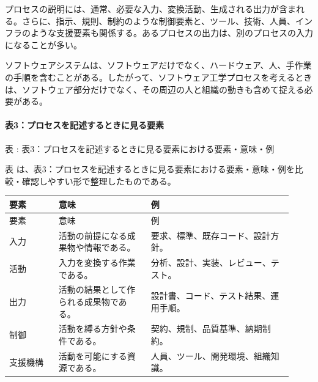 プロセスの説明には、通常、必要な入力、変換活動、生成される出力が含まれる。さらに、指示、規則、制約のような制御要素と、ツール、技術、人員、インフラのような支援要素も関係する。あるプロセスの出力は、別のプロセスの入力になることが多い。

ソフトウェアシステムは、ソフトウェアだけでなく、ハードウェア、人、手作業の手順を含むことがある。したがって、ソフトウェア工学プロセスを考えるときは、ソフトウェア部分だけでなく、その周辺の人と組織の動きも含めて捉える必要がある。

\paragraph{表3：プロセスを記述するときに見る要素}
\par\smallskip\noindent{}\label{tab:ch10-03}表 \thetable: 表3：プロセスを記述するときに見る要素における要素・意味・例\par\smallskip
表 \thetable は、表3：プロセスを記述するときに見る要素における要素・意味・例を比較・確認しやすい形で整理したものである。\par\smallskip
\begin{longtable}{>{\raggedright\arraybackslash}p{0.16\linewidth}>{\raggedright\arraybackslash}p{0.30\linewidth}>{\raggedright\arraybackslash}p{0.46\linewidth}}
\toprule
要素 & 意味 & 例\\
\midrule
\endfirsthead
\toprule
要素 & 意味 & 例\\
\midrule
\endhead
入力 & 活動の前提になる成果物や情報である。 & 要求、標準、既存コード、設計方針。\\
活動 & 入力を変換する作業である。 & 分析、設計、実装、レビュー、テスト。\\
出力 & 活動の結果として作られる成果物である。 & 設計書、コード、テスト結果、運用手順。\\
制御 & 活動を縛る方針や条件である。 & 契約、規制、品質基準、納期制約。\\
支援機構 & 活動を可能にする資源である。 & 人員、ツール、開発環境、組織知識。\\
\bottomrule
\end{longtable}
